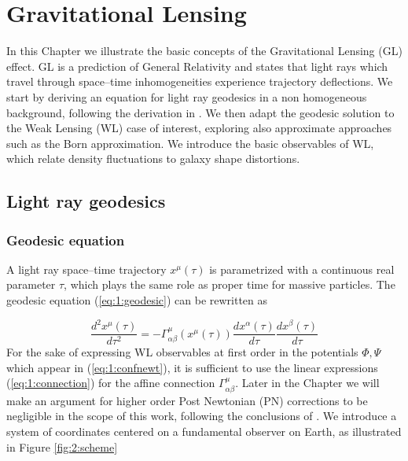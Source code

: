 
\chapter{Gravitational Lensing}
\lhead[\fancyplain{}{\thepage}]{\fancyplain{}{\rightmark}}
 \thispagestyle{plain}
\setlength{\parindent}{10mm}
\label{chp:2}

In this Chapter we illustrate the basic concepts of the Gravitational Lensing (GL) effect. GL is a prediction of General Relativity and states that light rays which travel through space--time inhomogeneities experience trajectory deflections. We start by deriving an equation for light ray geodesics in a non homogeneous background, following the derivation in \citep{Dodelson-C11}. We then adapt the geodesic solution to the Weak Lensing (WL) case of interest, exploring also approximate approaches such as the Born approximation. We introduce the basic observables of WL, which relate density fluctuations to galaxy shape distortions. 

\section{Light ray geodesics}

\subsection{Geodesic equation} 

A light ray space--time trajectory $x^\mu(\tau)$ is parametrized with a continuous real parameter $\tau$, which plays the same role as proper time for massive particles. The geodesic equation (\ref{eq:1:geodesic}) can be rewritten as 

\begin{equation}
\label{eq:2:geodesic}
\frac{d^2 x^\mu(\tau)}{d\tau^2} = -\Gamma_{\alpha\beta}^\mu(x^\mu(\tau)) \frac{d x^\alpha(\tau)}{d\tau}\frac{d x^\beta(\tau)}{d\tau}
\end{equation}
%
For the sake of expressing WL observables at first order in the potentials $\Phi,\Psi$ which appear in (\ref{eq:1:confnewt}), it is sufficient to use the linear expressions (\ref{eq:1:connection}) for the affine connection $\Gamma^\mu_{\alpha\beta}$. Later in the Chapter we will make an argument for higher order Post Newtonian (PN) corrections to be negligible in the scope of this work, following the conclusions of \citep{PNLensing}. We introduce a system of coordinates centered on a fundamental observer on Earth, as illustrated in Figure \ref{fig:2:scheme}

